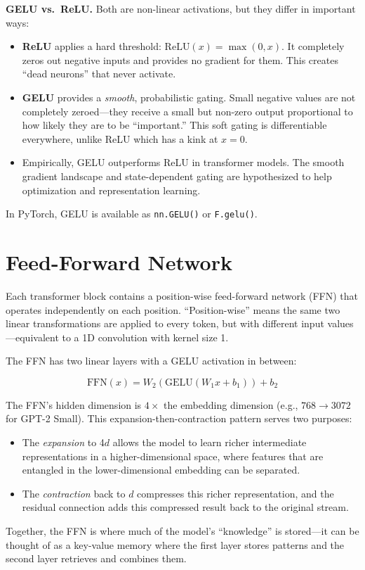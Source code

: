 \begin{keyconcept}
  \textbf{GELU vs.\ ReLU.} Both are non-linear activations, but they differ in
  important ways:
  \begin{itemize}
    \item \textbf{ReLU} applies a hard threshold: $\text{ReLU}(x) = \max(0, x)$.
          It completely zeros out negative inputs and provides no gradient
          for them. This creates ``dead neurons'' that never activate.
    \item \textbf{GELU} provides a \emph{smooth}, probabilistic gating. Small
          negative values are not completely zeroed---they receive a small but
          non-zero output proportional to how likely they are to be
          ``important.'' This soft gating is differentiable everywhere, unlike
          ReLU which has a kink at $x = 0$.
    \item Empirically, GELU outperforms ReLU in transformer models. The smooth
          gradient landscape and state-dependent gating are hypothesized to
          help optimization and representation learning.
  \end{itemize}
  In PyTorch, GELU is available as \texttt{nn.GELU()} or
  \texttt{F.gelu()}.
\end{keyconcept}

\section{Feed-Forward Network}

Each transformer block contains a position-wise feed-forward network (FFN)
that operates independently on each position. ``Position-wise'' means the
same two linear transformations are applied to every token, but with different
input values---equivalent to a 1D convolution with kernel size 1.

The FFN has two linear layers with a GELU activation in between:

\[
  \text{FFN}(x) = W_2\!\left(\text{GELU}(W_1 x + b_1)\right) + b_2
\]

\begin{keyconcept}
  The FFN's hidden dimension is $4\times$ the embedding dimension
  (e.g., $768 \rightarrow 3072$ for GPT-2 Small). This expansion-then-contraction
  pattern serves two purposes:
  \begin{itemize}
    \item The \emph{expansion} to 4$d$ allows the model to learn richer
          intermediate representations in a higher-dimensional space, where
          features that are entangled in the lower-dimensional embedding can
          be separated.
    \item The \emph{contraction} back to $d$ compresses this richer
          representation, and the residual connection adds this compressed
          result back to the original stream.
  \end{itemize}
  Together, the FFN is where much of the model's ``knowledge'' is stored---it
  can be thought of as a key-value memory where the first layer stores patterns
  and the second layer retrieves and combines them.
\end{keyconcept}


